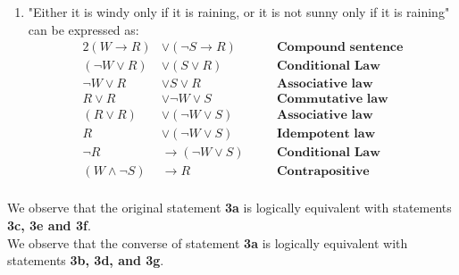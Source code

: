 \begin{enumerate}[label=(\alph*)]
    \item "Either it is windy only if it is raining, or it is not sunny only if it is raining" can be expressed as:
        \begin{alignat*}{2}
            (W \rightarrow R) &\vee (\neg S \rightarrow R) && \quad \textbf{Compound sentence}\\
            (\neg W \vee R) &\vee (S \vee R) && \quad \textbf{Conditional Law}\\
            \neg W \vee R &\vee S \vee R && \quad \textbf{Associative law}\\
            R \vee R &\vee \neg W \vee S && \quad \textbf{Commutative law}\\
            (R \vee R) &\vee (\neg W \vee S) && \quad \textbf{Associative law}\\
            R &\vee (\neg W \vee S) && \quad \textbf{Idempotent law}\\
            \neg R &\rightarrow (\neg W \vee S) && \quad \textbf{Conditional Law}\\
            (W \wedge \neg S) &\rightarrow R && \quad \textbf{Contrapositive}\\
        \end{alignat*}
\end{enumerate}

We observe that the original statement \textbf{3a} is logically equivalent with statements \textbf{3c, 3e and 3f}. \\
We observe that the converse of statement \textbf{3a} is logically equivalent with statements \textbf{3b, 3d, and 3g}.

\pagebreak
